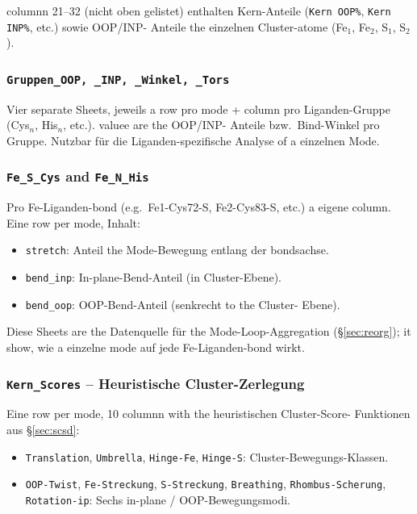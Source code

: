 \documentclass[11pt,a4paper,twoside]{article}
\theoremstyle{remark}
\begin{document}
columnn 21--32 (nicht oben gelistet) enthalten Kern-Anteile
(\texttt{Kern OOP\%}, \texttt{Kern INP\%}, etc.) sowie OOP/INP-
Anteile the einzelnen Cluster-atome (Fe$_1$, Fe$_2$, S$_1$, S$_2$).

\subsubsection*{\texttt{Gruppen\_OOP, \_INP, \_Winkel, \_Tors}}

Vier separate Sheets, jeweils a row pro mode + column pro
Liganden-Gruppe (Cys$_n$, His$_n$, etc.). valuee are the OOP/INP-
Anteile bzw.\ Bind-Winkel pro Gruppe. Nutzbar f\"ur die
Liganden-spezifische Analyse of a einzelnen Mode.

\subsubsection*{\texttt{Fe\_S\_Cys} and \texttt{Fe\_N\_His}}

Pro Fe-Liganden-bond (e.g.\ Fe1-Cys72-S, Fe2-Cys83-S, etc.)
a eigene column. Eine row per mode, Inhalt:
\begin{itemize}\setlength{\itemsep}{0pt}
  \item \texttt{stretch}: Anteil the Mode-Bewegung entlang der
        bondsachse.
  \item \texttt{bend\_inp}: In-plane-Bend-Anteil (in Cluster-Ebene).
  \item \texttt{bend\_oop}: OOP-Bend-Anteil (senkrecht to the Cluster-
        Ebene).
\end{itemize}

Diese Sheets are the Datenquelle f\"ur the Mode-Loop-Aggregation
(\S\ref{sec:reorg}); it show, wie a einzelne mode auf jede
Fe-Liganden-bond wirkt.

\subsubsection*{\texttt{Kern\_Scores} -- Heuristische Cluster-Zerlegung}

Eine row per mode, 10 columnn with the heuristischen Cluster-Score-
Funktionen aus \S\ref{sec:scsd}:

\begin{itemize}\setlength{\itemsep}{0pt}
  \item \texttt{Translation}, \texttt{Umbrella}, \texttt{Hinge-Fe},
        \texttt{Hinge-S}: Cluster-Bewegungs-Klassen.
  \item \texttt{OOP-Twist}, \texttt{Fe-Streckung},
        \texttt{S-Streckung}, \texttt{Breathing},
        \texttt{Rhombus-Scherung}, \texttt{Rotation-ip}:
        Sechs in-plane / OOP-Bewegungsmodi.
\end{itemize}
\end{document}
